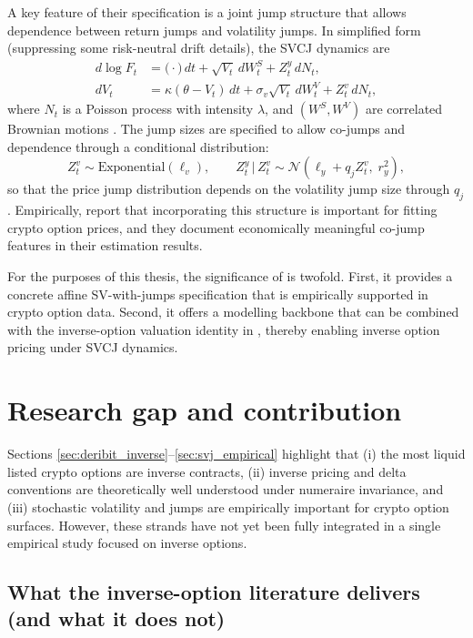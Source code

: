 \documentclass[a4paper,titlepage,12pt]{report}
\theoremstyle{plain}
\begin{document}
A key feature of their specification is a joint jump structure that allows dependence between return
jumps and volatility jumps. In simplified form (suppressing some risk-neutral drift details), the SVCJ
dynamics are
\begin{align}
d\log F_t &= \big(\cdot\big)\,dt + \sqrt{V_t}\,dW_t^S + Z_t^y\,dN_t,\\
dV_t      &= \kappa(\theta - V_t)\,dt + \sigma_v\sqrt{V_t}\,dW_t^V + Z_t^v\,dN_t,
\end{align}
where $N_t$ is a Poisson process with intensity $\lambda$, and $(W^S,W^V)$ are correlated Brownian
motions \citep{HouEtAl2020}. The jump sizes are specified to allow co-jumps and dependence through a
conditional distribution:
\begin{equation}
Z_t^v \sim \text{Exponential}(\ell_v), \qquad
Z_t^y\,\big|\,Z_t^v \sim \mathcal{N}\!\left(\ell_y + q_j Z_t^v,\; r_y^2\right),
\label{eq:hou_jump_spec}
\end{equation}
so that the price jump distribution depends on the volatility jump size through $q_j$. Empirically, \citet{HouEtAl2020} report that incorporating this structure is
important for fitting crypto option prices, and they document economically meaningful co-jump features in their estimation results.

For the purposes of this thesis, the significance of \citet{HouEtAl2020} is twofold. First, it
provides a concrete affine SV-with-jumps specification that is empirically supported in crypto option
data. Second, it offers a modelling backbone that can be combined with the inverse-option valuation
identity in \citet{LucicSepp2024}, thereby enabling inverse option pricing under SVCJ dynamics.

\section{Research gap and contribution}\label{sec:gap_contrib}

Sections \ref{sec:deribit_inverse}--\ref{sec:svj_empirical} highlight that (i) the most liquid listed crypto options are inverse contracts, (ii) inverse pricing and delta conventions are theoretically
well understood under numeraire invariance, and (iii) stochastic volatility and jumps are empirically important for crypto option surfaces. However, these strands have not yet been fully integrated in a single empirical
study focused on inverse options.

\subsection{What the inverse-option literature delivers (and what it does not)}\label{subsec:gap_inverse_lit}
\end{document}
